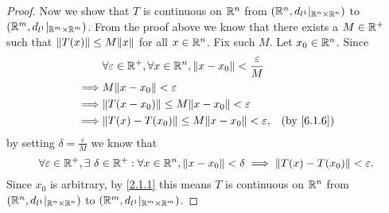 \begin{proof}
  Now we show that \(T\) is continuous on \(\R^n\) from \((\R^n, d_{l^1}|_{\R^n \times \R^n})\) to \((\R^m, d_{l^1}|_{\R^m \times \R^m})\).
  From the proof above we know that there exists a \(M \in \R^+\) such that \(\norm*{T(x)} \leq M \norm*{x}\) for all \(x \in \R^n\).
  Fix such \(M\).
  Let \(x_0 \in \R^n\).
  Since
  \begin{align*}
             & \forall \varepsilon \in \R^+, \forall x \in \R^n, \norm*{x - x_0} < \frac{\varepsilon}{M}                            \\
    \implies & M \norm*{x - x_0} < \varepsilon                                                                                      \\
    \implies & \norm*{T(x - x_0)} \leq M \norm*{x - x_0} < \varepsilon                                                              \\
    \implies & \norm*{T(x) - T(x_0)} \leq M \norm*{x - x_0} < \varepsilon,                               & \text{(by \cref{6.1.6})}
  \end{align*}
  by setting \(\delta = \frac{\varepsilon}{M}\) we know that
  \[
    \forall \varepsilon \in \R^+, \exists\ \delta \in \R^+ : \forall x \in \R^n, \norm*{x - x_0} < \delta \implies \norm*{T(x) - T(x_0)} < \varepsilon.
  \]
  Since \(x_0\) is arbitrary, by \cref{2.1.1} this means \(T\) is continuous on \(\R^n\) from \((\R^n, d_{l^1}|_{\R^n \times \R^n})\) to \((\R^m, d_{l^1}|_{\R^m \times \R^m})\).
\end{proof}